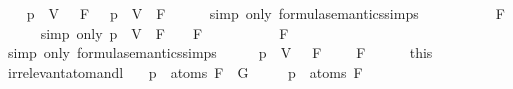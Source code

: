 \begin{isabellebody}
\ \ \isamarkupfalse%
\ {\isachardoublequoteopen}{\isasymA}{\isacharparenleft}p\ {\isacharcolon}{\isacharequal}\ V{\isacharparenright}\ {\isasymTurnstile}\ \isactrlbold {\isasymnot}\ F\ {\isacharequal}\ {\isacharparenleft}{\isasymnot}\ {\isasymA}{\isacharparenleft}p\ {\isacharcolon}{\isacharequal}\ V{\isacharparenright}\ {\isasymTurnstile}\ F{\isacharparenright}{\isachardoublequoteclose}\isanewline
\ \ \ \ \isamarkupfalse%
\ {\isacharparenleft}simp\ only{\isacharcolon}\ formula{\isacharunderscore}semantics{\isachardot}simps{\isacharparenleft}{}{\isacharparenright}{\isacharparenright}\isanewline
\ \ \isamarkupfalse%
\ \isamarkupfalse%
\ {\isachardoublequoteopen}{\isasymdots}\ {\isacharequal}\ {\isacharparenleft}{\isasymnot}\ {\isasymA}\ {\isasymTurnstile}\ F{\isacharparenright}{\isachardoublequoteclose}\isanewline
\ \ \ \ \isamarkupfalse%
\ {\isacharparenleft}simp\ only{\isacharcolon}\ {\isacartoucheopen}{\isasymA}{\isacharparenleft}p\ {\isacharcolon}{\isacharequal}\ V{\isacharparenright}\ {\isasymTurnstile}\ F\ {\isasymlongleftrightarrow}\ {\isasymA}\ {\isasymTurnstile}\ F{\isacartoucheclose}{\isacharparenright}\isanewline
\ \ \isamarkupfalse%
\ \isamarkupfalse%
\ {\isachardoublequoteopen}{\isasymdots}\ {\isacharequal}\ {\isasymA}\ {\isasymTurnstile}\ \isactrlbold {\isasymnot}\ F{\isachardoublequoteclose}\isanewline
\ \ \ \ \isamarkupfalse%
\ {\isacharparenleft}simp\ only{\isacharcolon}\ formula{\isacharunderscore}semantics{\isachardot}simps{\isacharparenleft}{}{\isacharparenright}{\isacharparenright}\isanewline
\ \ \isamarkupfalse%
\ \isamarkupfalse%
\ {\isachardoublequoteopen}{\isasymA}{\isacharparenleft}p\ {\isacharcolon}{\isacharequal}\ V{\isacharparenright}\ {\isasymTurnstile}\ \isactrlbold {\isasymnot}\ F\ {\isasymlongleftrightarrow}\ {\isasymA}\ {\isasymTurnstile}\ \isactrlbold {\isasymnot}\ F{\isachardoublequoteclose}\isanewline
\ \ \ \ \isamarkupfalse%
\ this\isanewline
{}\isamarkupfalse%
%
\endisatagproof
{\isafoldproof}%
%
\isadelimproof
\isanewline
%
\endisadelimproof
\isanewline
{}\isamarkupfalse%
\ irrelevant{\isacharunderscore}atom{\isacharunderscore}and{\isacharunderscore}l{}{\isacharcolon}\isanewline
\ \ \ {\isachardoublequoteopen}p\ {\isasymnotin}\ atoms\ {\isacharparenleft}F\ \isactrlbold {\isasymand}\ G{\isacharparenright}{\isachardoublequoteclose}\isanewline
\ \ \ \ \ {\isachardoublequoteopen}p\ {\isasymnotin}\ atoms\ F{\isachardoublequoteclose}\isanewline

\end{isabellebody}
